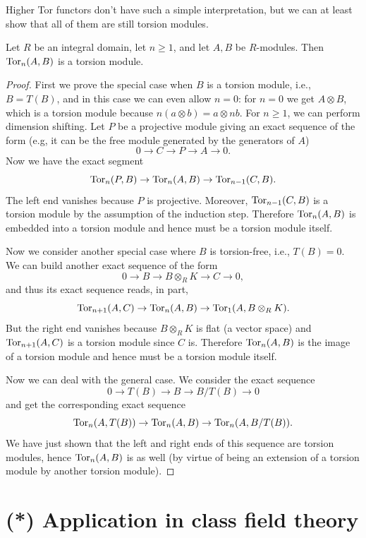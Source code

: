 Higher Tor functors don't have such a simple interpretation, but we can at least show that all of them are still torsion modules.

\begin{thm}
    Let $R$ be an integral domain, let $n\geq 1$, and let $A,B$ be $R$-modules. Then $\operatorname{Tor}_n(A,B)$ is a torsion module.
\end{thm}
\begin{proof}
    First we prove the special case when $B$ is a torsion module, i.e.,  $B=T(B)$, and in this case we can even allow $n=0$: for $n=0$ we get $A\otimes B$, which is a torsion module because $n(a\otimes b)=a\otimes nb$. For $n\geq 1$, we can perform dimension shifting. Let $P$ be a projective module giving an exact sequence of the form (e.g, it can be the free module generated by the generators of $A$)
    \[0\to C\to P\to A\to 0.\]
    Now we have the exact segment
    \[\operatorname{Tor}_n(P,B)\to \operatorname{Tor}_n(A,B)\to \operatorname{Tor}_{n-1}(C,B).\]
    The left end vanishes because $P$ is projective. Moreover, $\operatorname{Tor}_{n-1}(C,B)$ is a torsion module by the assumption of the induction step. Therefore $\operatorname{Tor}_n(A,B)$ is embedded into a torsion module and hence must be a torsion module itself.

    Now we consider another special case where $B$ is torsion-free, i.e., $T(B)=0$. We can build another exact sequence of the form
    \[0\to B\to B\otimes_R K\to C\to 0,\]
    and thus its exact sequence reads, in part,
    \[\operatorname{Tor}_{n+1}(A,C)\to \operatorname{Tor}_n(A,B)\to \operatorname{Tor}_1(A,B\otimes_R K).\]
    But the right end vanishes because $B\otimes_R K$ is flat (a vector space) and $\operatorname{Tor}_{n+1}(A,C)$ is a torsion module since $C$ is. Therefore $ \operatorname{Tor}_n(A,B)$ is the image of a torsion module and hence must be a torsion module itself.

    Now we can deal with the general case. We consider the exact sequence
    \[0\to T(B)\to B\to B\slash T(B)\to 0\]
    and get the corresponding exact sequence
    \[\operatorname{Tor}_n(A,T(B))\to \operatorname{Tor}_n(A,B)\to \operatorname{Tor}_n(A,B\slash T(B)).\]
    We have just shown that the left and right ends of this sequence are torsion modules, hence $\operatorname{Tor}_n(A,B)$ is as well (by virtue of being an extension of a torsion module by another torsion module).
\end{proof}




\section{(*) Application in class field theory}

